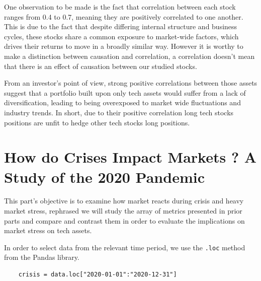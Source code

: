 \documentclass{article}
\begin{document}
One observation to be made is the fact that correlation between each stock ranges from 0.4 to 0.7, meaning they are positively correlated to one another. This is due to the fact that despite differing internal structure and business cycles, these stocks share a common exposure to market-wide factors, which drives their returns to move in a broadly similar way. However it is worthy to make a distinction between causation and correlation, a correlation doesn't mean that there is an effect of causation between our studied stocks.


\vspace{0.3cm}

From an investor's point of view, strong positive correlations between those assets suggest that a portfolio built upon only tech assets would suffer from a lack of diversification, leading to being overexposed to market wide fluctuations and industry trends. In short, due to their positive correlation long tech stocks positions are unfit to hedge other tech stocks long positions.
\pagebreak
\section{How do Crises Impact Markets ? A Study of the 2020 Pandemic}

This part's objective is to examine how market reacts during crisis and heavy market stress, rephrased we will study the array of metrics presented in prior parts and compare and contrast them in order to evaluate the implications on market stress on tech assets.

\vspace{0.3cm}
In order to select data from the relevant time period, we use the \texttt{.loc} method from the Pandas library.
\begin{lstlisting}
    crisis = data.loc["2020-01-01":"2020-12-31"]
\end{lstlisting}
\end{document}
